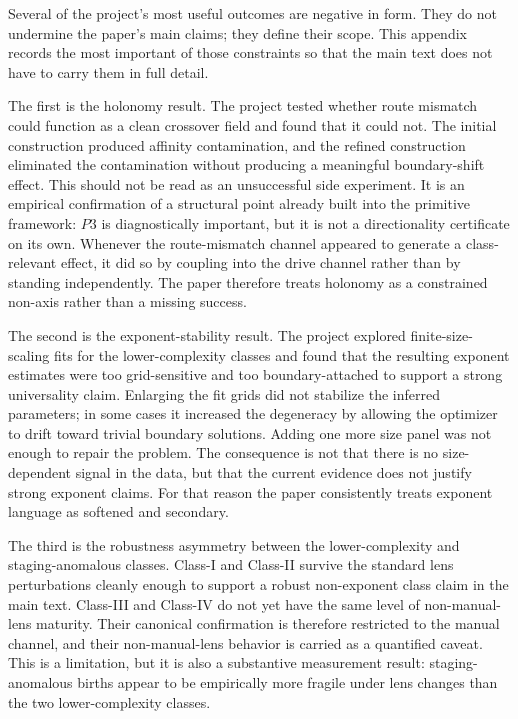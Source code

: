 \documentclass[11pt]{article}
\begin{document}
Several of the project's most useful outcomes are negative in form. They do not undermine the paper's main claims; they define their scope. This appendix records the most important of those constraints so that the main text does not have to carry them in full detail.

The first is the holonomy result. The project tested whether route mismatch could function as a clean crossover field and found that it could not. The initial construction produced affinity contamination, and the refined construction eliminated the contamination without producing a meaningful boundary-shift effect. This should not be read as an unsuccessful side experiment. It is an empirical confirmation of a structural point already built into the primitive framework: $P3$ is diagnostically important, but it is not a directionality certificate on its own. Whenever the route-mismatch channel appeared to generate a class-relevant effect, it did so by coupling into the drive channel rather than by standing independently. The paper therefore treats holonomy as a constrained non-axis rather than a missing success.

The second is the exponent-stability result. The project explored finite-size-scaling fits for the lower-complexity classes and found that the resulting exponent estimates were too grid-sensitive and too boundary-attached to support a strong universality claim. Enlarging the fit grids did not stabilize the inferred parameters; in some cases it increased the degeneracy by allowing the optimizer to drift toward trivial boundary solutions. Adding one more size panel was not enough to repair the problem. The consequence is not that there is no size-dependent signal in the data, but that the current evidence does not justify strong exponent claims. For that reason the paper consistently treats exponent language as softened and secondary.

The third is the robustness asymmetry between the lower-complexity and staging-anomalous classes. Class-I and Class-II survive the standard lens perturbations cleanly enough to support a robust non-exponent class claim in the main text. Class-III and Class-IV do not yet have the same level of non-manual-lens maturity. Their canonical confirmation is therefore restricted to the manual channel, and their non-manual-lens behavior is carried as a quantified caveat. This is a limitation, but it is also a substantive measurement result: staging-anomalous births appear to be empirically more fragile under lens changes than the two lower-complexity classes.
\end{document}

